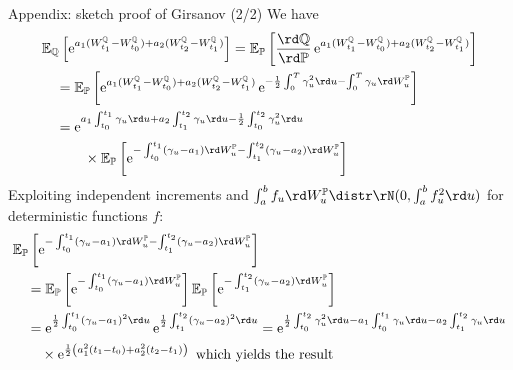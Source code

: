\documentclass[pdf, handout]{beamer}
\newcommand{\e}{\operatorname{e}}
\begin{document}
\begin{frame}{Appendix: sketch proof of Girsanov (2/2)}
We  have 
\begin{align*}
&\mathbb{E}_{\mathbb{Q}}\left[ \e^{a_1 (W_{t_1}^{\mathbb{Q}} - W_{t_0}^{\mathbb{Q}}) + a_2 (W^{\mathbb{Q}}_{t_2} - W^{\mathbb{Q}}_{t_1})}\right]= 
\mathbb{E}_{\mathbb{P}}\left[\frac{\rd\mathbb{Q}}{\rd\mathbb{P}} \e^{a_1 (W_{t_1}^{\mathbb{Q}} - W^{\mathbb{Q}}_{t_0}) + a_2 (W^{\mathbb{Q}}_{t_2} - W^{\mathbb{Q}}_{t_1})}\right] \\
 &\quad=
\mathbb{E}_{\mathbb{P}}\left[
\e^{a_1 (W^{\mathbb{Q}}_{t_1} - W^{\mathbb{Q}}_{t_0}) + a_2 (W^{\mathbb{Q}}_{t_2} - W^{\mathbb{Q}}_{t_1})}
\e^{-\frac{1}{2}\int_0^T \gamma_u^2 \rd u - \int_0^T \gamma_u \rd W^{\mathbb{P}}_u}
\right] \\
 &\quad=
\e^{
a_1 \int_{t_0}^{t_1} \gamma_u \rd u + a_2 \int_{t_1}^{t_2} \gamma_u \rd u 
-\frac{1}{2}\int_{t_0}^{t_2} \gamma_u^2  \rd u} \\
&\qquad\quad \times
\mathbb{E}_{\mathbb{P}}\left[
\e^{ 
-\int_{t_0}^{t_1} ( \gamma_u - a_1)  \rd W^{\mathbb{P}}_u
-\int_{t_1}^{t_2} (\gamma_u - a_2)  \rd W^{\mathbb{P}}_u
}
\right]
\end{align*}
Exploiting independent increments and  
$\int_a^b f_u \rd W^{\mathbb{P}}_u \distr \rN( 0, \int_a^b f_u^2 \rd u)$ for deterministic functions $f$:
\begin{align*}
& \mathbb{E}_{\mathbb{P}}\left[
\e^{ 
-\int_{t_0}^{t_1} ( \gamma_u - a_1)  \rd W^{\mathbb{P}}_u
-\int_{t_1}^{t_2} (\gamma_u - a_2)  \rd W^{\mathbb{P}}_u
}
\right] \\
&\quad =
\mathbb{E}_{\mathbb{P}}
\left[
\e^{ 
-\int_{t_0}^{t_1} ( \gamma_u - a_1)  \rd W^{\mathbb{P}}_u }
\right]
\mathbb{E}_{\mathbb{P}}
\left[\e^{ 
-\int_{t_1}^{t_2} ( \gamma_u - a_2)  \rd W^{\mathbb{P}}_u}\right]
\\
&\quad
= \e^{
\frac{1}{2} \int_{t_0}^{t_1} ( \gamma_u - a_1)^2 \rd u
}\e^{
\frac{1}{2} \int_{t_1}^{t_2} ( \gamma_u - a_2)^2 \rd u
}  = \e^{\frac{1}{2}\int_{t_0}^{t_2} \gamma_u^2 \rd u 
- a_1 \int_{t_0}^{t_1} \gamma_u \rd u 
- a_2 \int_{t_1}^{t_2} \gamma_u \rd u
} \\
&\qquad \times \e^{\frac{1}{2}\left( a_1^2 (t_1-t_0) + a_2^2 (t_2- t_1)\right)
} \text{ which yields the result}
\end{align*}
\end{frame}
\end{document}
